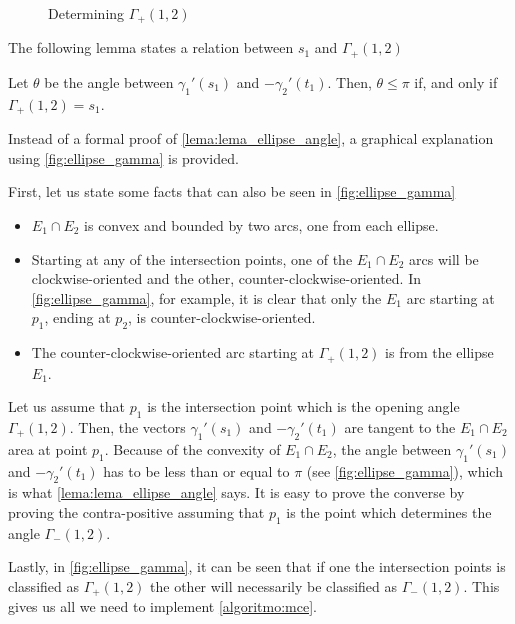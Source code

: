 \begin{figure}[H]
\centering

    \caption{Determining $\Gamma_+(1,2)$}
    
    \fautor
    \label{fig:ellipse_gamma}
\end{figure}

The following lemma states a relation between $s_1$ and $\Gamma_+(1,2)$

\begin{lema}\label{lema:lema_ellipse_angle}
	Let $\theta$ be the angle between $\gamma_1'(s_1)$ and $-\gamma_2'(t_1)$. Then, $\theta \le \pi$ if, and only if $\Gamma_+(1,2)=s_1$.
\end{lema}

Instead of a formal proof of \autoref{lema:lema_ellipse_angle}, a graphical explanation using \autoref{fig:ellipse_gamma} is provided.


First, let us state some facts that can also be seen in \autoref{fig:ellipse_gamma}

\begin{itemize}
    \item $E_1 \cap E_2$ is convex and bounded by two arcs, one from each ellipse.
    \item Starting at any of the intersection points, one of the $E_1 \cap E_2$ arcs will be clockwise-oriented and the other, counter-clockwise-oriented. In \autoref{fig:ellipse_gamma}, for example, it is clear that only the $E_1$ arc starting at $p_1$, ending at $p_2$, is counter-clockwise-oriented.  
    
    
    \item The counter-clockwise-oriented arc starting at $\Gamma_+(1,2)$ is from the ellipse $E_1$.
\end{itemize}


Let us assume that $p_1$ is the intersection point which is the opening angle $\Gamma_+(1,2)$. Then, the vectors $\gamma_1'(s_1)$ and $-\gamma_2'(t_1)$ are tangent to the $E_1 \cap E_2$ area at point $p_1$. Because of the convexity of $E_1 \cap E_2$, the angle between $\gamma_1'(s_1)$ and $-\gamma_2'(t_1)$ has to be less than or equal to $\pi$ (see \autoref{fig:ellipse_gamma}), which is what \autoref{lema:lema_ellipse_angle} says. It is easy to prove the converse by proving the contra-positive assuming that $p_1$ is the point which determines the angle $\Gamma_-(1,2)$.

Lastly, in \autoref{fig:ellipse_gamma}, it can be seen that if one the intersection points is classified as $\Gamma_+(1,2)$ the other will necessarily be classified as $\Gamma_-(1,2)$. This gives us all we need to implement \autoref{algoritmo:mce}.


